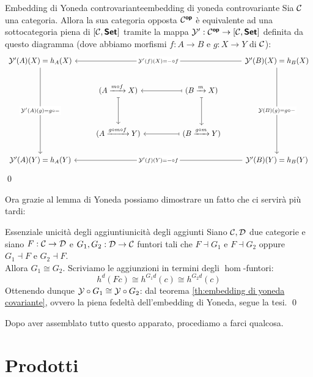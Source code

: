 \documentclass{article}
\renewcommand\C{\mc{C}}
\newcommand\D{\mc{D}}
\begin{document}
\begin{corollary}{Embedding di Yoneda controvariante}{embedding di yoneda controvariante}
    Sia $\C$ una categoria. Allora la sua categoria opposta $\C^\op$ è equivalente ad una sottocategoria piena di $[\C, \setcat]$ tramite la mappa $\mc{Y}' : \C^\op \to [\C, \setcat]$ definita da questo diagramma (dove abbiamo morfismi $f:A\to B$ e $g:X\to Y$ di $\C$):
    \[\begin{tikzcd}
    	{\mc{Y}'(A)(X) = h_A(X)} &&&& {\mc{Y}'(B)(X) = h_B(X)} \\
    	& {(A \xrightarrow{m\circ f} X)} && {(B \xrightarrow{m} X)} \\
    	\\
    	& {(A \xrightarrow{g\circ m\circ f} Y)} && {(B \xrightarrow{g\circ m} Y)} \\
    	{\mc{Y}'(A)(Y) = h_A(Y)} &&&& {\mc{Y}'(B)(Y) = h_B(Y)}
    	\arrow["{\mc{Y}'(A)(g) = g\circ -}"{description}, from=1-1, to=5-1]
    	\arrow["{\mc{Y}'(f)(X) = -\circ f}"{description}, from=1-5, to=1-1]
    	\arrow["{\mc{Y}(B)(g) = g\circ -}"{description}, from=1-5, to=5-5]
    	\arrow[maps to, from=2-2, to=4-2]
    	\arrow[maps to, from=2-4, to=2-2]
    	\arrow[maps to, from=2-4, to=4-4]
	    \arrow[maps to, from=4-4, to=4-2]
	    \arrow["{\mc{Y}'(f)(Y) = -\circ f}"{description}, from=5-5, to=5-1]
    \end{tikzcd}\]
    \qed
\end{corollary}

Ora grazie al lemma di Yoneda possiamo dimostrare un fatto che ci servirà più tardi:

\begin{lemma}{Essenziale unicità degli aggiunti}{unicità degli aggiunti}
    Siano $\C,\D$ due categorie e siano $F:\C\to\D$ e $G_1,G_2: \D\to\C$ funtori tali che $F\dashv G_1$ e $F\dashv G_2$ oppure $G_1\dashv F$ e $G_2\dashv F$.\\
    Allora $G_1\cong G_2$.
    \proof 
    Scriviamo le aggiunzioni in termini degli $\hom$-funtori:
    \[ h^d(Fc) \cong h^{G_1 d}(c) \cong h^{G_2 d}(c) \]
    Ottenendo dunque $\mathcal{Y}\circ G_1 \cong \mathcal{Y}\circ G_2$: dal teorema \ref{th:embedding di yoneda covariante}, ovvero la piena fedeltà dell'embedding di Yoneda, segue la tesi.
    \qed
\end{lemma}

Dopo aver assemblato tutto questo apparato, procediamo a farci qualcosa.

\pagebreak 

\section{Prodotti}
\end{document}
